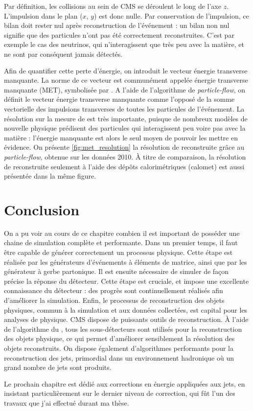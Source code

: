 Par définition, les collisions au sein de CMS se déroulent le long de l'axe $z$. L'impulsion dans le plan ($x$, $y$) est donc nulle. Par conservation de l'impulsion, ce bilan doit rester nul après reconstruction de l'événement : un bilan non nul signifie que des particules n'ont pas été correctement reconstruites. C'est par exemple le cas des neutrinos, qui n'interagissent que très peu avec la matière, et ne sont par conséquent jamais détectés.

Afin de quantifier cette perte d'énergie, on introduit le vecteur énergie transverse manquante. La norme de ce vecteur est communément appelée énergie transverse manquante (MET), symbolisée par \met. A l'aide de l'algorithme de \emph{particle-flow}, on définit le vecteur énergie transverse manquante comme l'opposé de la somme vectorielle des impulsions transverses de toutes les particules de l'événement. La résolution sur la mesure de \met est très importante, puisque de nombreux modèles de nouvelle physique prédisent des particules qui interagissent peu voire pas avec la matière : l'énergie manquante est alors le seul moyen de pouvoir les mettre en évidence. On présente \cref{fig:met_resolution} la résolution de \met reconstruite grâce au \emph{particle-flow}, obtenue sur les données 2010. À titre de comparaison, la résolution de \met reconstruite seulement à l'aide des dépôts calorimétriques (calomet) est aussi présentée dans la même figure.

\section{Conclusion}

On a pu voir au cours de ce chapitre combien il est important de posséder une chaine de simulation complète et performante. Dans un premier temps, il faut être capable de générer correctement un processus physique. Cette étape est réalisée par les générateurs d'événements à éléments de matrice, ainsi que par les générateur à gerbe partonique. Il est ensuite nécessaire de simuler de façon précise la réponse du détecteur. Cette étape est cruciale, et impose une excellente connaissance du détecteur : des progrès sont continuellement réalisés afin d'améliorer la simulation. Enfin, le processus de reconstruction des objets physiques, commun à la simulation et aux données collectées, est capital pour les analyses de physique. CMS dispose de puissants outils de reconstruction. À l'aide de l'algorithme du \pf, tous les sous-détecteurs sont utilisés pour la reconstruction des objets physique, ce qui permet d'améliorer sensiblement la résolution des objets reconstruits. On dispose également d'algorithmes performants pour la reconstruction des jets, primordial dans un environnement hadronique où un grand nombre de jets sont produits.

\medskip

Le prochain chapitre est dédié aux corrections en énergie appliquées aux jets, en insistant particulièrement sur le dernier niveau de correction, qui fût l'un des travaux que j'ai effectué durant ma thèse.